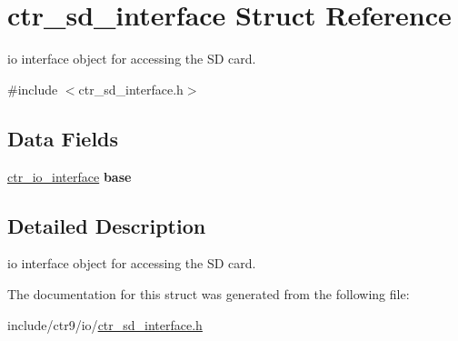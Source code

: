 \hypertarget{structctr__sd__interface}{}\section{ctr\+\_\+sd\+\_\+interface Struct Reference}
\label{structctr__sd__interface}


io interface object for accessing the SD card.  




{\ttfamily \#include $<$ctr\+\_\+sd\+\_\+interface.\+h$>$}

\subsection*{Data Fields}
\begin{DoxyCompactItemize}
\item 
\hyperlink{structctr__io__interface}{ctr\+\_\+io\+\_\+interface} {\bfseries base}\hypertarget{structctr__sd__interface_a68d74fd6fd9707ffb88e532df872423a}{}\label{structctr__sd__interface_a68d74fd6fd9707ffb88e532df872423a}

\end{DoxyCompactItemize}


\subsection{Detailed Description}
io interface object for accessing the SD card. 

The documentation for this struct was generated from the following file\+:\begin{DoxyCompactItemize}
\item 
include/ctr9/io/\hyperlink{ctr__sd__interface_8h}{ctr\+\_\+sd\+\_\+interface.\+h}\end{DoxyCompactItemize}
